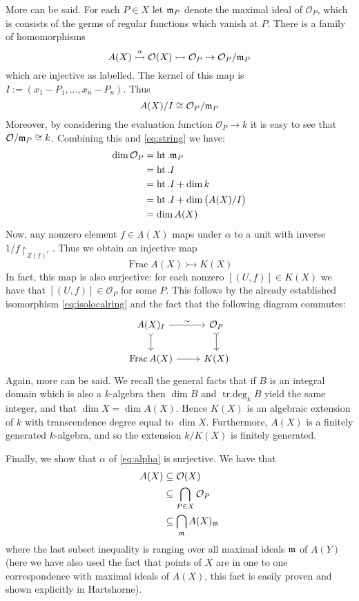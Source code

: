 \documentclass[12pt]{article}
\theoremstyle{plain}
\theoremstyle{definition}
\newcommand{\call}[1]{\mathcal{#1}}
\newcommand{\lto}{\longrightarrow}
\begin{document}
More can be said. For each $P \in X$ let $\frak{m}_P$ denote the maximal ideal of $\call{O}_P$, which is consists of the germs of regular functions which vanish at $P$. There is a family of homomorphisms
\[A(X) \stackrel{\alpha}{\rightarrowtail} \call{O}(X) \rightarrowtail \call{O}_P \to \call{O}_P/\frak{m}_P\]
which are injective as labelled. The kernel of this map is $I:= (x_1 - P_1,...,x_n - P_n)$. Thus
\begin{equation}\label{eq:string}
    A(X)/I \cong \call{O}_P/{\frak{m}_P}
\end{equation}
Moreover, by considering the evaluation function $\call{O}_P \lto k$ it is easy to see that $\call{O}/\frak{m}_P \cong k$. Combining this and \eqref{eq:string} we have:
\begin{align*}
    \operatorname{dim}\call{O}_P &= \operatorname{ht}.\frak{m}_P\\
    &= \operatorname{ht}.I\\
    &= \operatorname{ht}.I + \operatorname{dim}k\\
    &= \operatorname{ht}.I + \operatorname{dim}\big(A(X)/I\big)\\
    &= \operatorname{dim}A(X)
\end{align*}
Now, any nonzero element $f \in A(X)$ maps under $\alpha$ to a unit with inverse $1/f\restriction_{Z(f)^c}$. Thus we obtain an injective map
\[\operatorname{Frac}A(X) \rightarrowtail K(X)\]
In fact, this map is also surjective: for each nonzero $[(U,f)] \in K(X)$ we have that $[(U,f)] \in \call{O}_P$ for some $P$. This follows by the already established isomorphism \eqref{eq:isolocalring} and the fact that the following diagram commutes:
\[
\begin{tikzcd}
A(X)_{I}\arrow[r,"{\sim}"]\arrow[d,rightarrowtail] & \call{O}_P\arrow[d,rightarrowtail]\\
\operatorname{Frac}A(X)\arrow[r] & K(X)
\end{tikzcd}
\]
Again, more can be said. We recall the general facts that if $B$ is an integral domain which is also a $k$-algebra then $\operatorname{dim}B$ and $\operatorname{tr.deg}_kB$ yield the same integer, and that $\operatorname{dim}X = \operatorname{dim}A(X)$. Hence $K(X)$ is an algebraic extension of $k$ with transcendence degree equal to $\operatorname{dim}X$. Furthermore, $A(X)$ is a finitely generated $k$-algebra, and so the extension $k/K(X)$ is finitely generated.

Finally, we show that $\alpha$ of \eqref{eq:alpha} is surjective. We have that
\begin{align}
    A(X) &\subseteq \call{O}(X)\\
    &\subseteq \bigcap_{P \in X}\call{O}_P\\
    &\subseteq \bigcap_{\frak{m}}A(X)_\frak{m}
\end{align}
where the last subset inequality is ranging over all maximal ideals $\frak{m}$ of $A(Y)$ (here we have also used the fact that points of $X$ are in one to one correspondence with maximal ideals of $A(X)$, this fact is easily proven and shown explicitly in Hartshorne).
\end{document}
